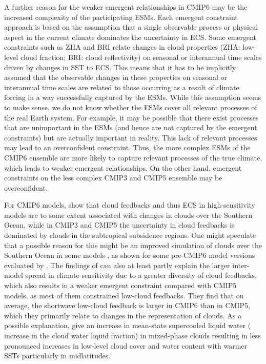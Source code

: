 A further reason for the weaker emergent relationships in \acs{CMIP}6 may be
the increased complexity of the participating \acp{ESM}. Each emergent
constraint approach is based on the assumption that a single observable process
or physical aspect in the current climate dominates the uncertainty in
\ac{ECS}. Some emergent constraints such as ZHA and BRI relate changes in cloud
properties (ZHA: low-level cloud fraction; BRI: cloud reflectivity) on seasonal
or interannual time scales driven by changes in \ac{SST} to \ac{ECS}. This
means that it has to be implicitly assumed that the observable changes in these
properties on seasonal or interannual time scales are related to those
occurring as a result of climate forcing in a way successfully captured by the
\acp{ESM}. While this assumption seems to make sense, we do not know whether
the \acp{ESM} cover all relevant processes of the real Earth system. For
example, it may be possible that there exist processes that are unimportant in
the \acp{ESM} (and hence are not captured by the emergent constraints) but are
actually important in reality. This lack of relevant processes may lead to an
overconfident constraint. Thus, the more complex \acp{ESM} of the \acs{CMIP}6
ensemble are more likely to capture relevant processes of the true climate,
which leads to weaker emergent relationships. On the other hand, emergent
constraints on the less complex \acs{CMIP}3 and \acs{CMIP}5 ensemble may be
overconfident.

For \acs{CMIP}6 models, \textcite{Zelinka2020} show that cloud feedbacks and
thus \ac{ECS} in high-sensitivity models are to some extent associated with
changes in clouds over the Southern Ocean, while in \acs{CMIP}3 and \acs{CMIP}5
the uncertainty in cloud feedbacks is dominated by clouds in the subtropical
subsidence regions. One might speculate that a possible reason for this might
be an improved simulation of clouds over the Southern Ocean in some models
\autocite{BodasSalcedo2019, Gettelman2019}, as shown for some pre-\acs{CMIP}6
model versions evaluated by \textcite{Lauer2018}. The findings of
\textcite{Zelinka2020} can also at least partly explain the larger inter-model
spread in climate sensitivity due to a greater diversity of cloud feedbacks,
which also results in a weaker emergent constraint compared with \acs{CMIP}5
models, as most of them constrained low-cloud feedbacks. They find that on
average, the shortwave low-cloud feedback is larger in \acs{CMIP}6 than in
\acs{CMIP}5, which they primarily relate to changes in the representation of
clouds. As a possible explanation, \textcite{Zelinka2020} give an increase in
mean-state supercooled liquid water (\ie{} increase in the cloud water liquid
fraction) in mixed-phase clouds resulting in less pronounced increases in
low-level cloud cover and water content with warmer \acp{SST} particularly in
midlatitudes.

